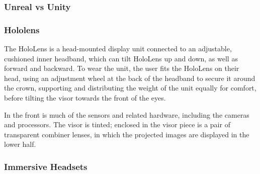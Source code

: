     \subsubsection{Unreal vs Unity}

    \subsubsection{Hololens}
    The HoloLens is a head-mounted display unit connected to an adjustable, cushioned inner headband, which can tilt HoloLens up and down, as well as forward and backward. To wear the unit, the user fits the HoloLens on their head, using an adjustment wheel at the back of the headband to secure it around the crown, supporting and distributing the weight of the unit equally for comfort, before tilting the visor towards the front of the eyes.

    In the front is much of the sensors and related hardware, including the cameras and processors. The visor is tinted; enclosed in the visor piece is a pair of transparent combiner lenses, in which the projected images are displayed in the lower half. %

    \subsubsection{Immersive Headsets}
    
